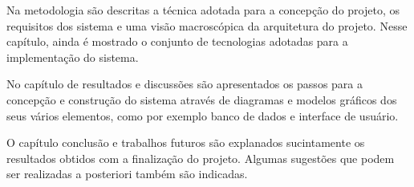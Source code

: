 Na metodologia são descritas a técnica adotada para a concepção do projeto, os requisitos dos sistema e uma visão macroscópica da arquitetura do projeto. Nesse capítulo, ainda é mostrado o conjunto de tecnologias adotadas para a implementação do sistema.    

No capítulo de resultados e discussões são apresentados os passos para a concepção e construção do sistema através de diagramas e modelos gráficos dos seus vários elementos, como por exemplo banco de dados e interface de usuário.

O capítulo conclusão e trabalhos futuros são explanados sucintamente os resultados obtidos com a finalização do projeto. Algumas sugestões que podem ser realizadas a posteriori também são indicadas.
